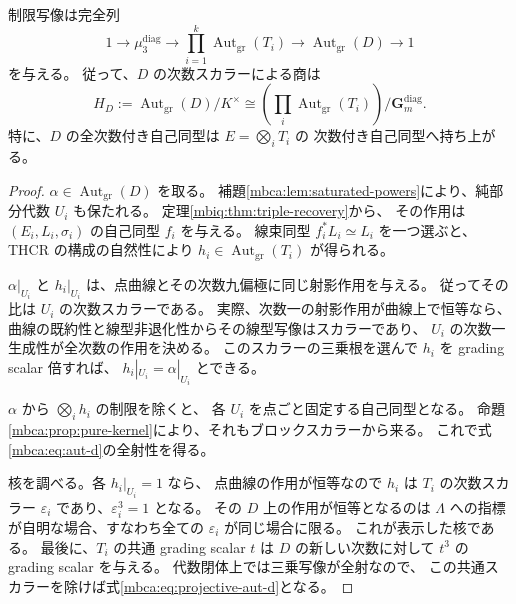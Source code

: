 \begin{theorem}[中心商の自己同型は因子へ持ち上がる]
\label{mbca:thm:center-automorphisms}
制限写像は完全列
\begin{equation}\label{mbca:eq:aut-d}
 1\longrightarrow\mu_3^{\mathrm{diag}}
 \longrightarrow\prod_{i=1}^k\operatorname{Aut}_{\mathrm{gr}}(T_i)
 \longrightarrow\operatorname{Aut}_{\mathrm{gr}}(D)
 \longrightarrow1
\end{equation}
を与える。
従って、$D$ の次数スカラーによる商は
\begin{equation}\label{mbca:eq:projective-aut-d}
 H_D:=\operatorname{Aut}_{\mathrm{gr}}(D)/K^\times
   \cong
   \left(\prod_i\operatorname{Aut}_{\mathrm{gr}}(T_i)\right)/
                                         \mathbf G_m^{\mathrm{diag}}.
\end{equation}
特に、$D$ の全次数付き自己同型は $E=\bigotimes_iT_i$ の
次数付き自己同型へ持ち上がる。
\end{theorem}
\begin{proof}
$\alpha\in\operatorname{Aut}_{\mathrm{gr}}(D)$ を取る。
補題\ref{mbca:lem:saturated-powers}により、純部分代数 $U_i$ も保たれる。
定理\ref{mbiq:thm:triple-recovery}から、
その作用は $(E_i,L_i,\sigma_i)$ の自己同型 $f_i$ を与える。
線束同型 $f_i^*L_i\simeq L_i$ を一つ選ぶと、
THCR の構成の自然性により $h_i\in\operatorname{Aut}_{\mathrm{gr}}(T_i)$ が得られる。

$\alpha|_{U_i}$ と $h_i|_{U_i}$ は、点曲線とその次数九偏極に同じ射影作用を与える。
従ってその比は $U_i$ の次数スカラーである。
実際、次数一の射影作用が曲線上で恒等なら、
曲線の既約性と線型非退化性からその線型写像はスカラーであり、
$U_i$ の次数一生成性が全次数の作用を決める。
このスカラーの三乗根を選んで $h_i$ を grading scalar 倍すれば、
$h_i|_{U_i}=\alpha|_{U_i}$ とできる。

$\alpha$ から $\bigotimes_i h_i$ の制限を除くと、
各 $U_i$ を点ごと固定する自己同型となる。
命題\ref{mbca:prop:pure-kernel}により、それもブロックスカラーから来る。
これで式\eqref{mbca:eq:aut-d}の全射性を得る。

核を調べる。各 $h_i|_{U_i}=1$ なら、
点曲線の作用が恒等なので $h_i$ は $T_i$ の次数スカラー
$\varepsilon_i$ であり、$\varepsilon_i^3=1$ となる。
その $D$ 上の作用が恒等となるのは
$\Lambda$ への指標が自明な場合、すなわち全ての $\varepsilon_i$ が同じ場合に限る。
これが表示した核である。
最後に、$T_i$ の共通 grading scalar $t$ は
$D$ の新しい次数に対して $t^3$ の grading scalar を与える。
代数閉体上では三乗写像が全射なので、
この共通スカラーを除けば式\eqref{mbca:eq:projective-aut-d}となる。
\end{proof}

